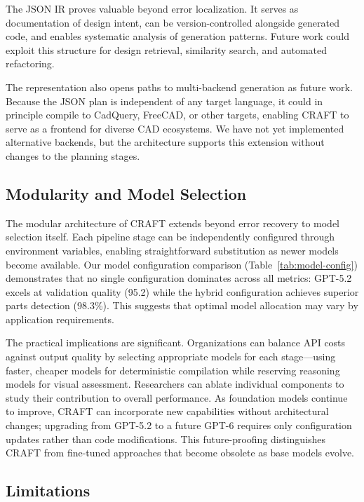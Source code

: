 \documentclass[5p,twocolumn,10pt,times]{elsarticle}
\begin{document}
The JSON IR proves valuable beyond error localization. It serves as documentation of design intent, can be version-controlled alongside generated code, and enables systematic analysis of generation patterns. Future work could exploit this structure for design retrieval, similarity search, and automated refactoring.

The representation also opens paths to multi-backend generation as future work. Because the JSON plan is independent of any target language, it could in principle compile to CadQuery, FreeCAD, or other targets, enabling CRAFT to serve as a frontend for diverse CAD ecosystems. We have not yet implemented alternative backends, but the architecture supports this extension without changes to the planning stages.

\subsection{Modularity and Model Selection}

The modular architecture of CRAFT extends beyond error recovery to model selection itself. Each pipeline stage can be independently configured through environment variables, enabling straightforward substitution as newer models become available. Our model configuration comparison (Table~\ref{tab:model-config}) demonstrates that no single configuration dominates across all metrics: GPT-5.2 excels at validation quality (95.2) while the hybrid configuration achieves superior parts detection (98.3\%). This suggests that optimal model allocation may vary by application requirements.

The practical implications are significant. Organizations can balance API costs against output quality by selecting appropriate models for each stage---using faster, cheaper models for deterministic compilation while reserving reasoning models for visual assessment. Researchers can ablate individual components to study their contribution to overall performance. As foundation models continue to improve, CRAFT can incorporate new capabilities without architectural changes; upgrading from GPT-5.2 to a future GPT-6 requires only configuration updates rather than code modifications. This future-proofing distinguishes CRAFT from fine-tuned approaches that become obsolete as base models evolve.

\subsection{Limitations}
\end{document}
